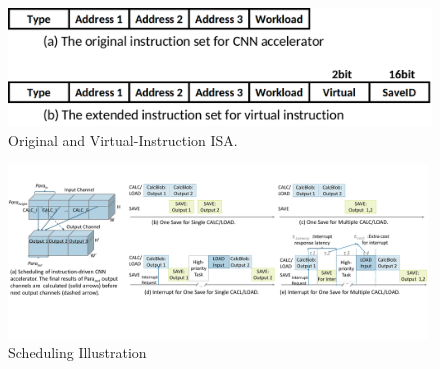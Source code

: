 





\begin{figure}[t]
	\centering
    \vspace{-0.1cm} 
    \setlength{\abovecaptionskip}{0cm} 
	\includegraphics[width=0.9\linewidth]{fig/instructions.png}
	\caption{Original and Virtual-Instruction ISA.}
	\label{fig:instructions}
\end{figure}



\begin{figure}[t]
    \centering
    \vspace{-0.1cm} 
    \setlength{\abovecaptionskip}{0cm} 
    \setlength{\belowcaptionskip}{-0.05cm} 
	\includegraphics[width=0.99\textwidth]{fig/singlesave.pdf} 	
    \caption{
		Scheduling Illustration
    }
	\label{fig:singlesave}
\end{figure}



